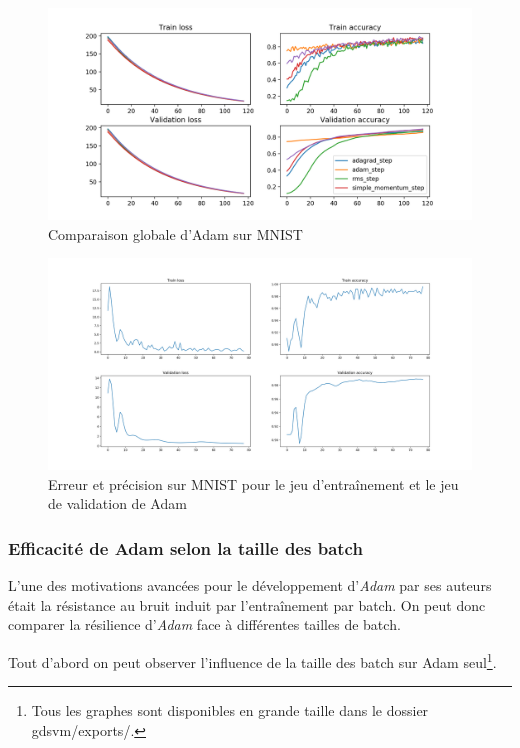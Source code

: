 \documentclass[fleqn,11pt, titlepage, french]{article}
\begin{document}
	\begin{figure}[H]
		\centering
		\includegraphics[width=1\linewidth]{../gdsvm/exports/mnist-comparison}
		\caption{Comparaison globale d'Adam sur MNIST}
		\label{fig:mnist-comparison}
	\end{figure}
	
	
		\begin{figure}[H]
		\centering
		\includegraphics[scale=0.35]{../gdsvm/exports/adam_train.png}
		\caption{Erreur et précision sur MNIST pour le jeu d'entraînement et le jeu de validation de Adam}
	\end{figure}
	
	
	\subsubsection{Efficacité de Adam selon la taille des batch}
	
	L'une des motivations avancées pour le développement d'\emph{Adam} par ses auteurs était la résistance au bruit induit par l'entraînement par batch. On peut donc comparer la résilience d'\emph{Adam} face à différentes tailles de batch.
	
	Tout d'abord on peut observer l'influence de la taille des batch sur Adam seul\footnote{Tous les graphes sont disponibles en grande taille dans le dossier gdsvm/exports/.}.
	
\end{document}
